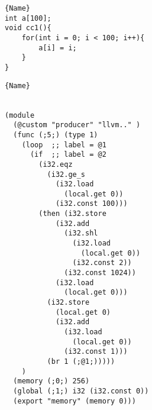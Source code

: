 

{\captionsetup{width=0.39\linewidth}
\noindent\begin{minipage}[t]{0.4\linewidth}
    \begin{lstlisting}[label=example:cprogram,caption={C program containing function declaration, loops, conditionals and memory access.},captionpos=t]{Name}
int a[100];
void cc1(){
    for(int i = 0; i < 100; i++){
        a[i] = i;
    }
}

    \end{lstlisting}
    
\end{minipage}\hfill
\noindent\begin{minipage}[t]{0.6\linewidth}
\captionsetup{width=0.89\linewidth}

    \begin{lstlisting}[label=example:wasmprogram,caption={WebAssembly code for C code in \autoref{example:cprogram}.}, captionpos=t]{Name}

    
(module
  (@custom "producer" "llvm.." )
  (func (;5;) (type 1)
    (loop  ;; label = @1
      (if  ;; label = @2
        (i32.eqz
          (i32.ge_s
            (i32.load
              (local.get 0))
            (i32.const 100)))
        (then (i32.store
            (i32.add
              (i32.shl
                (i32.load
                  (local.get 0))
                (i32.const 2))
              (i32.const 1024))
            (i32.load
              (local.get 0)))
          (i32.store
            (local.get 0)
            (i32.add
              (i32.load
                (local.get 0))
              (i32.const 1)))
          (br 1 (;@1;)))))
    )
  (memory (;0;) 256)
  (global (;1;) i32 (i32.const 0))
  (export "memory" (memory 0)))
    \end{lstlisting}
\end{minipage}
}

